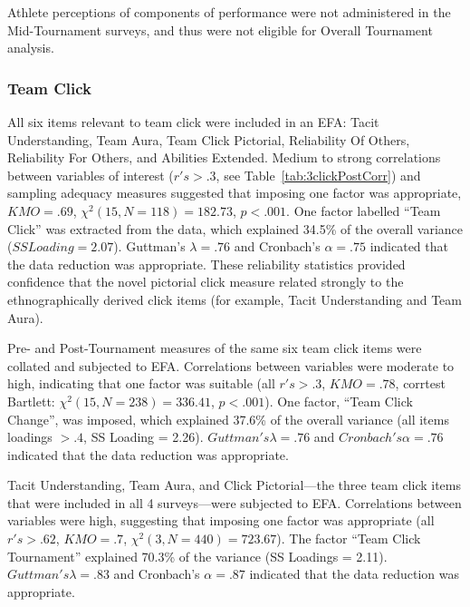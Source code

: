 \begin{CJK}{UTF8}{gbsn}
Athlete perceptions of components of performance were not administered in the Mid-Tournament surveys, and thus were not eligible for Overall Tournament analysis.




\subsubsection{Team Click}

All six items relevant to team click were included in an EFA: Tacit Understanding, Team Aura, Team Click Pictorial, Reliability Of Others, Reliability For Others, and Abilities Extended.  Medium to strong correlations between variables of interest ($r's > .3$, see Table~\ref{tab:3clickPostCorr}) and sampling adequacy measures suggested that imposing one factor was appropriate, $KMO =  .69$, $\chi^2(15, N = 118) = 182.73$, $p < .001$.  One factor labelled ``Team Click'' was extracted from the data, which explained 34.5\% of the overall variance ($SS Loading = 2.07$).  Guttman's $\lambda =.76$ and Cronbach's $\alpha = .75$ indicated that the data reduction was appropriate.  These reliability statistics provided confidence that the novel pictorial click measure related strongly to the ethnographically derived click items (for example, Tacit Understanding and Team Aura).


Pre- and Post-Tournament measures of the same six team click items were collated and subjected to EFA. Correlations between variables were moderate to high, indicating that one factor was suitable (all $r's > .3$, $KMO = .78$, corrtest Bartlett: $\chi^2(15, N = 238) = 336.41$, $p < .001$).  One factor, ``Team Click Change'', was imposed, which explained 37.6\% of the overall variance (all items loadings $> .4$, SS Loading = 2.26).  $Guttman's \lambda =.76$ and $Cronbach's \alpha = .76$ indicated that the data reduction was appropriate.

Tacit Understanding, Team Aura, and Click Pictorial---the three team click items that were included in all 4 surveys---were subjected to EFA.  Correlations between variables were high, suggesting that imposing one factor was appropriate (all $r's > .62$, $KMO = .7$, $\chi^2(3, N = 440) = 723.67$).  The factor ``Team Click Tournament'' explained 70.3\% of the variance (SS Loadings = 2.11).  $Guttman's \lambda =.83$ and Cronbach's $\alpha = .87$ indicated that the data reduction was appropriate.


\end{CJK}
